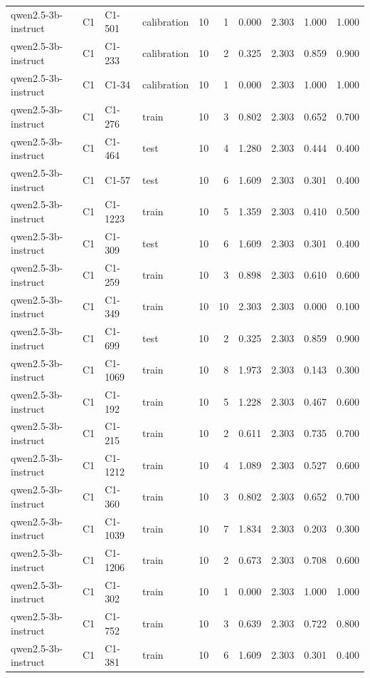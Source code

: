 \begin{table}
\begin{tabular}{llllrrrrrr}
qwen2.5-3b-instruct & C1 & C1-501 & calibration & 10 & 1 & 0.000 & 2.303 & 1.000 & 1.000 \\
qwen2.5-3b-instruct & C1 & C1-233 & calibration & 10 & 2 & 0.325 & 2.303 & 0.859 & 0.900 \\
qwen2.5-3b-instruct & C1 & C1-34 & calibration & 10 & 1 & 0.000 & 2.303 & 1.000 & 1.000 \\
qwen2.5-3b-instruct & C1 & C1-276 & train & 10 & 3 & 0.802 & 2.303 & 0.652 & 0.700 \\
qwen2.5-3b-instruct & C1 & C1-464 & test & 10 & 4 & 1.280 & 2.303 & 0.444 & 0.400 \\
qwen2.5-3b-instruct & C1 & C1-57 & test & 10 & 6 & 1.609 & 2.303 & 0.301 & 0.400 \\
qwen2.5-3b-instruct & C1 & C1-1223 & train & 10 & 5 & 1.359 & 2.303 & 0.410 & 0.500 \\
qwen2.5-3b-instruct & C1 & C1-309 & test & 10 & 6 & 1.609 & 2.303 & 0.301 & 0.400 \\
qwen2.5-3b-instruct & C1 & C1-259 & train & 10 & 3 & 0.898 & 2.303 & 0.610 & 0.600 \\
qwen2.5-3b-instruct & C1 & C1-349 & train & 10 & 10 & 2.303 & 2.303 & 0.000 & 0.100 \\
qwen2.5-3b-instruct & C1 & C1-699 & test & 10 & 2 & 0.325 & 2.303 & 0.859 & 0.900 \\
qwen2.5-3b-instruct & C1 & C1-1069 & train & 10 & 8 & 1.973 & 2.303 & 0.143 & 0.300 \\
qwen2.5-3b-instruct & C1 & C1-192 & train & 10 & 5 & 1.228 & 2.303 & 0.467 & 0.600 \\
qwen2.5-3b-instruct & C1 & C1-215 & train & 10 & 2 & 0.611 & 2.303 & 0.735 & 0.700 \\
qwen2.5-3b-instruct & C1 & C1-1212 & train & 10 & 4 & 1.089 & 2.303 & 0.527 & 0.600 \\
qwen2.5-3b-instruct & C1 & C1-360 & train & 10 & 3 & 0.802 & 2.303 & 0.652 & 0.700 \\
qwen2.5-3b-instruct & C1 & C1-1039 & train & 10 & 7 & 1.834 & 2.303 & 0.203 & 0.300 \\
qwen2.5-3b-instruct & C1 & C1-1206 & train & 10 & 2 & 0.673 & 2.303 & 0.708 & 0.600 \\
qwen2.5-3b-instruct & C1 & C1-302 & train & 10 & 1 & 0.000 & 2.303 & 1.000 & 1.000 \\
qwen2.5-3b-instruct & C1 & C1-752 & train & 10 & 3 & 0.639 & 2.303 & 0.722 & 0.800 \\
qwen2.5-3b-instruct & C1 & C1-381 & train & 10 & 6 & 1.609 & 2.303 & 0.301 & 0.400 \\

\end{tabular}
\end{table}
